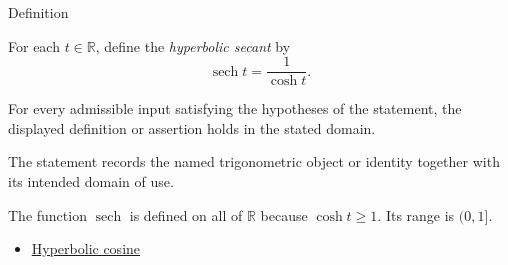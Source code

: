

\begin{definitionbox}{Definition}
\begin{definition}
\label{def:hyperbolic-secant}
For each $t\in\mathbb{R}$, define the \emph{hyperbolic secant} by
\[
  \operatorname{sech} t=\frac{1}{\cosh t}.
\]
\end{definition}
\end{definitionbox}
\begin{remark*}
For every admissible input satisfying the hypotheses of the statement, the
displayed definition or assertion holds in the stated domain.
\end{remark*}

\begin{remark*}[Interpretation]
The statement records the named trigonometric object or identity together with
its intended domain of use.
\end{remark*}

\begin{remark*}
The function $\operatorname{sech}$ is defined on all of $\mathbb{R}$ because
$\cosh t\geq 1$. Its range is $(0,1]$.
\end{remark*}
\begin{dependencies}
\begin{itemize}
  \item \hyperref[def:hyperbolic-cosine]{Hyperbolic cosine}
\end{itemize}
\end{dependencies}
